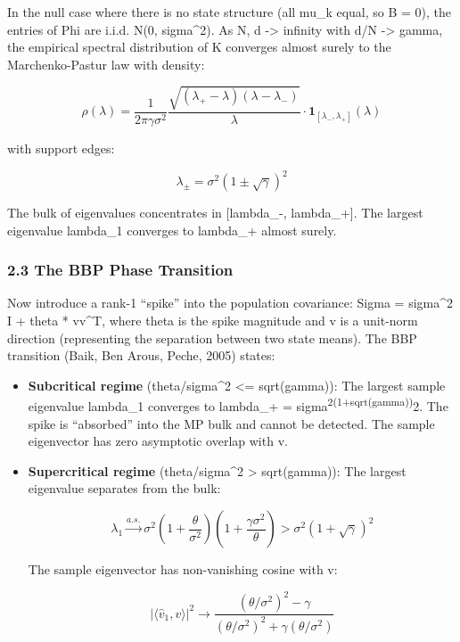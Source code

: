 \documentclass[
  12pt,
]{article}
\begin{document}
In the null case where there is no state structure (all mu\_k equal, so
B = 0), the entries of Phi are i.i.d. N(0, sigma\^{}2). As N, d
-\textgreater{} infinity with d/N -\textgreater{} gamma, the empirical
spectral distribution of K converges almost surely to the
Marchenko-Pastur law with density:

\[\rho(\lambda) = \frac{1}{2\pi \gamma \sigma^2} \frac{\sqrt{(\lambda_+ - \lambda)(\lambda - \lambda_-)}}{\lambda} \cdot \mathbf{1}_{[\lambda_-, \lambda_+]}(\lambda)\]

with support edges:

\[\lambda_\pm = \sigma^2 (1 \pm \sqrt{\gamma})^2\]

The bulk of eigenvalues concentrates in {[}lambda\_-, lambda\_+{]}. The
largest eigenvalue lambda\_1 converges to lambda\_+ almost surely.

\subsubsection{2.3 The BBP Phase
Transition}\label{the-bbp-phase-transition}

Now introduce a rank-1 ``spike'' into the population covariance: Sigma =
sigma\^{}2 I + theta * vv\^{}T, where theta is the spike magnitude and v
is a unit-norm direction (representing the separation between two state
means). The BBP transition (Baik, Ben Arous, Peche, 2005) states:

\begin{itemize}
\item
  \textbf{Subcritical regime} (theta/sigma\^{}2 \textless= sqrt(gamma)):
  The largest sample eigenvalue lambda\_1 converges to lambda\_+ =
  sigma\textsuperscript{2(1+sqrt(gamma))}2. The spike is ``absorbed''
  into the MP bulk and cannot be detected. The sample eigenvector has
  zero asymptotic overlap with v.
\item
  \textbf{Supercritical regime} (theta/sigma\^{}2 \textgreater{}
  sqrt(gamma)): The largest eigenvalue separates from the bulk:

  \[\lambda_1 \xrightarrow{a.s.} \sigma^2 \left(1 + \frac{\theta}{\sigma^2}\right)\left(1 + \frac{\gamma \sigma^2}{\theta}\right) > \sigma^2 \left(1 + \sqrt{\gamma}\right)^2\]

  The sample eigenvector has non-vanishing cosine with v:

  \[|\langle \hat{v}_1, v \rangle|^2 \to \frac{(\theta/\sigma^2)^2 - \gamma}{(\theta/\sigma^2)^2 + \gamma (\theta/\sigma^2)}\]
\end{itemize}
\end{document}
